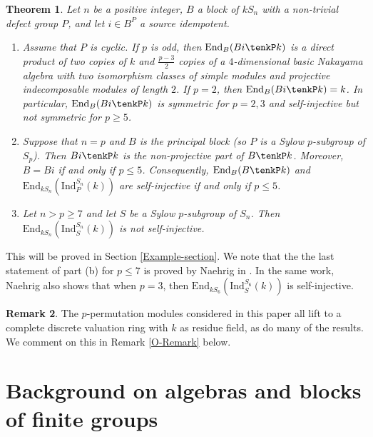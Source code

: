 \documentclass{amsart}
\theoremstyle{plain}\newtheorem{Theorem}{Theorem}[section]
\theoremstyle{plain}\newtheorem{Conjecture}[Theorem]{Conjecture}
\theoremstyle{plain}\newtheorem{Corollary}[Theorem]{Corollary}
\theoremstyle{plain}\newtheorem{Lemma}[Theorem]{Lemma}
\theoremstyle{plain}\newtheorem{Proposition}[Theorem]{Proposition}
\theoremstyle{definition}\newtheorem{Definition}[Theorem]{Definition}
\theoremstyle{definition}\newtheorem{Example}[Theorem]{Example}
\theoremstyle{definition}\newtheorem{Examples}[Theorem]{Examples}
\theoremstyle{definition}\newtheorem{Exercise}[Theorem]{Exercise}
\theoremstyle{definition}\newtheorem{Notation}[Theorem]{Notation}
\theoremstyle{definition}\newtheorem{Remark}[Theorem]{Remark}
\theoremstyle{definition}\newtheorem{Remarks}[Theorem]{Remarks}
\theoremstyle{plain}\newtheorem{Statement}[Theorem]{}
\def\End{\mathrm{End}}
\def\Ind{\mathrm{Ind}}    \def\tenC{\otimes_C}
\begin{document}
\begin{Theorem} \label{cyclic-Sp}   
Let $n$ be a positive integer, $B$  a block of  $kS_n $  with a non-trivial defect 
group $P$,   and  let $i \in B^P$   a source idempotent.  
\begin{enumerate}   

\item [{\rm (a)}]  
Assume that $P$  is cyclic. If  $p $ is  odd,  then    $\End_{B}(Bi\tenkP k)$    is a 
direct product  of two copies of $k$  and $\frac{p-3}{2}$ copies of a 
$4$-dimensional basic Nakayama  algebra with two isomorphism classes of 
simple modules and  projective  indecomposable modules of length $2$.    
If $p=2 $,  then $\End_{B}(Bi\tenkP k) =  k $.  In particular, $\End_{B}(Bi\tenkP k)$ 
is symmetric for $p=2, 3$ and   self-injective but not symmetric for $p\geq 5$.  

\item [{\rm (b)}]    
Suppose that $n=p $ and $B$ is the  principal block (so $P$ is a Sylow  $p$-subgroup 
of $S_p$).  Then $Bi\tenkP k $ is the non-projective  part of   $ B \tenkP k$. Moreover,  
$B=Bi$    if and only if  $p \leq 5 $.    Consequently,   $\End_{B}(B\tenkP k)$  and  
$\End_{kS_n}(\Ind_{P}^{S_n}(k)) $    are   self-injective if  and only  if    $p\leq 5 $.

\item [{\rm (c)}]    
Let $n >  p \geq 7 $ and let $S$  be  a Sylow $p$-subgroup of  $S_n$.  Then 
$\End_{kS_n}(\Ind^{S_n}_{S}(k))$  is not self-injective.
\end{enumerate}
\end{Theorem}

This will be proved in Section \ref{Example-section}.
We note that   the  the  last statement of part (b)  for  $p\leq  7 $     is  proved by  
Naehrig in   \cite{NaehrigPhD}.   In the same work,  Naehrig   also  shows  that    
when $p=3$, then  $\End_{kS_6}(\Ind_S^{S_6} (k))$  is self-injective.

\begin{Remark}
The $p$-permutation modules considered in this paper all lift to a complete
discrete valuation ring with $k$ as residue field, as do many of the results.
We comment on this in Remark \ref{O-Remark} below.
\end{Remark}

\section{Background on algebras and blocks of finite groups} \label{backgroundsection} 
\end{document}
